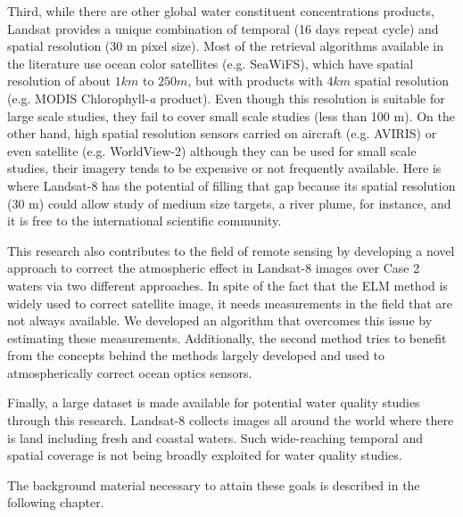 Third, while there are other global water constituent concentrations products, Landsat provides a unique combination of temporal (16 days repeat cycle) and spatial resolution (30 m pixel size). Most of the retrieval algorithms available in the literature use ocean color satellites (e.g. SeaWiFS), which have spatial resolution of about $1 km$ to $250 m$, but with products with $4km$ spatial resolution (e.g. MODIS Chlorophyll-{\it a} product). Even though this resolution is suitable for large scale studies, they fail to cover small scale studies (less than 100 m). On the other hand, high spatial resolution sensors carried on aircraft (e.g. AVIRIS) or even satellite (e.g. WorldView-2) although they can be used for small scale studies, their imagery tends to be expensive or not frequently available. Here is where Landsat-8 has the potential of filling that gap because its spatial resolution (30 m) could allow study of medium size targets, a river plume, for instance, and it is free to the international scientific community.

This research also contributes to the field of remote sensing by developing a novel approach to correct the atmospheric effect in Landsat-8 images over Case 2 waters via two different approaches. In spite of the fact that the ELM method is widely used to correct satellite image, it needs measurements in the field that are not always available. We developed an algorithm that overcomes this issue by estimating these measurements. Additionally, the { \color{red} second method} tries to benefit from the concepts behind the methods largely developed and used to atmospherically correct ocean optics sensors.

Finally, a large dataset is made available for potential water quality studies through this research. Landsat-8 collects images all around the world where there is land including fresh and coastal waters. Such wide-reaching temporal and spatial coverage is not being broadly exploited for water quality studies.

The background material necessary to attain these goals is described in the following chapter.
